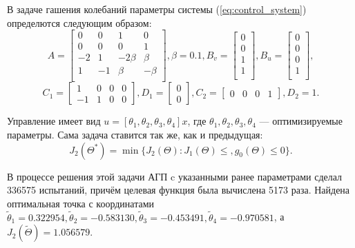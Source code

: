 В задаче гашения колебаний параметры системы (\ref{eq:control_system}) определются следующим
образом:
$$
A=\begin{bmatrix}
  0  & 0 & 1 & 0 \\
  0  & 0 & 0 & 1 \\
  -2  & 1 & -2\beta & \beta \\
  1  & -1 & \beta & -\beta \\
\end{bmatrix}, \beta = 0.1,
B_v=\begin{bmatrix}
0       \\
0       \\
1       \\
1       \\
\end{bmatrix},
B_u=\begin{bmatrix}
0       \\
0       \\
0       \\
1       \\
\end{bmatrix},
$$
$$
C_1=\begin{bmatrix}
1 & 0 & 0 & 0 \\
-1 & 1 & 0 & 0
\end{bmatrix},
D_1=\begin{bmatrix}
0 \\
0
\end{bmatrix},
C_2=\begin{bmatrix}
0 & 0 & 0  & 1
\end{bmatrix},D_2=1.
$$

Управление имеет вид \(u=[\theta_1,\theta_2, \theta_3,\theta_4]x\), где \(\theta_1,\theta_2, \theta_3,\theta_4\) ---
оптимизируемые параметры. Сама задача ставится так же, как и предыдущая:
\begin{displaymath}
   J_2(\Theta^*)=\min\{J_2(\Theta):J_1(\Theta)\leqslant, g_0(\Theta)\leqslant 0\}.
\end{displaymath}

В процессе решения этой задачи АГП c указанными ранее параметрами сделал 336575 испытаний, причём целевая функция
была вычислена 5173 раза. Найдена оптимальная точка с координатами
\(\widetilde\theta_1 =0.322954,\widetilde\theta_2=-0.583130, \widetilde\theta_3=-0.453491, \widetilde\theta_4=-0.970581\),
а \(J_2(\widetilde\Theta)=1.056579\).
